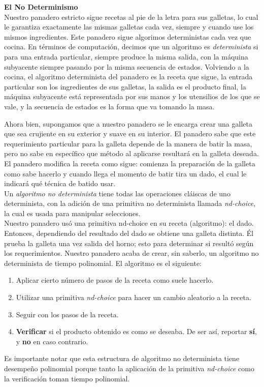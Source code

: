 \documentclass[11 pt, a4paper]{article}
\theoremstyle{definition}
\begin{document}
\begin{enumerate}
            \textbf{El No Determinismo} \\
            Nuestro panadero estricto sigue recetas al pie de la letra para sus galletas, lo cual le garantiza exactamente las mismas galletas cada vez, siempre y cuando use los mismos ingredientes. Este panadero sigue algorimos deterministas cada vez que cocina. En t\'erminos de computaci\'on, decimos que un algoritmo es \emph{determinista} si para una entrada particular, siempre produce la misma salida, con la m\'aquina subyacente siempre pasando por la misma secuencia de estados. Volviendo a la cocina, el algoritmo determinista del panadero es la receta que sigue, la entrada particular son los ingredientes de sus galletas, la salida es el producto final, la m\'aquina subyacente est\'a representada por sus manos y los utensilios de los que se vale, y la secuencia de estados es la forma que va tomando la masa. \par
            Ahora bien, supongamos que a nuestro panadero se le encarga crear una galleta que sea crujiente en su exterior y suave en su interior. El panadero sabe que este requerimiento particular para la galleta depende de la manera de batir la masa, pero no sabe en espec\'ifico que m\'etodo al aplicarse resultar\'a en la galleta deseada. El panadero modifica la receta como sigue: comienza la preparaci\'on de la galleta como sabe hacerlo y cuando llega el momento de batir tira un dado, el cual le indicar\'a qu\'e t\'ecnica de batido usar. \\

            Un \emph{algoritmo no determinista} tiene todas las operaciones cl\'aiscas de uno determinista, con la adici\'on de una primitiva no determinista llamada \emph{nd-choice}, la cual es usada para manipular selecciones. \\

            Nuestro panadero us\'o una primitiva nd-choice en su receta (algoritmo): el dado. Entonces, dependiendo del resultado del dado se obtiene una galleta distinta. \'El prueba la galleta una vez salida del horno; esto para determinar si result\'o seg\'un los requerimientos. Nuestro panadero acaba de crear, sin saberlo, un algoritmo no determinista de tiempo polinomial. El algoritmo es el siguiente:
            \begin{enumerate}
                \item Aplicar cierto n\'umero de pasos de la receta como suele hacerlo.
                \item Utilizar una primitiva \emph{nd-choice} para hacer un cambio aleatorio a la receta.
                \item Seguir con los pasos de la receta.
                \item \textbf{Verificar} si el producto obtenido es como se deseaba. De ser as\'i, reportar \textbf{s\'i}, y 
                        \textbf{no} en caso contrario.
            \end{enumerate}
            Es importante notar que esta estructura de algoritmo no determinista tiene desempe\~no polinomial porque tanto la aplicaci\'on de la primitiva \emph{nd-choice} como la verificaci\'on toman tiempo polinomial.


\end{enumerate}
\end{document}
